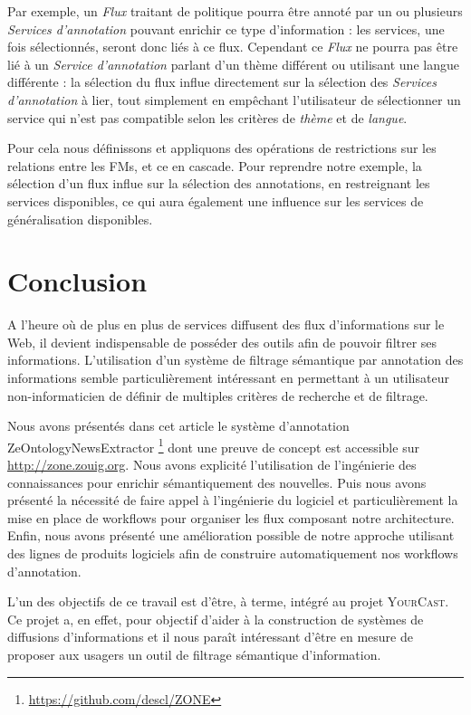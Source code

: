 \documentclass[]{easychair}
\newcommand{\Y}[0]{\textsc{YourCast}\xspace}
\begin{document}
Par exemple, un \textit{Flux} traitant de politique pourra être annoté par un ou plusieurs \textit{Services d'annotation} pouvant enrichir ce type d'information : les services, une fois sélectionnés, seront donc liés à ce flux. Cependant ce \textit{Flux} ne pourra pas être lié à un \textit{Service d'annotation} parlant d'un thème différent ou utilisant une langue différente : la sélection du flux influe directement sur la sélection des \textit{Services d'annotation} à lier, tout simplement en empêchant l'utilisateur de sélectionner un service qui n'est pas compatible selon les critères de \textit{thème} et de \textit{langue}.

Pour cela nous définissons et appliquons des opérations de restrictions sur les relations entre les FMs, et ce en cascade. Pour reprendre notre exemple, la sélection d'un flux influe sur la sélection des annotations, en restreignant les services disponibles, ce qui aura également une influence sur les services de généralisation disponibles. 

\section{Conclusion}
\label{sect:conclusion}
A l'heure où de plus en plus de services diffusent des flux d'informations sur le Web, il devient indispensable de posséder des outils afin de pouvoir filtrer ses informations. L'utilisation d'un système de filtrage sémantique par annotation des informations semble particulièrement intéressant en permettant à un utilisateur non-informaticien de définir de multiples critères de recherche et de filtrage.

Nous avons présentés dans cet article le système d'annotation ZeOntologyNewsExtractor \footnote{\url{https://github.com/descl/ZONE}} dont une preuve de concept est accessible sur \url{http://zone.zouig.org}. Nous avons explicité l'utilisation de l'ingénierie des connaissances pour enrichir sémantiquement des nouvelles. Puis nous avons présenté la nécessité de faire appel à l'ingénierie du logiciel et particulièrement la mise en place de workflows pour organiser les flux composant notre architecture. Enfin, nous avons présenté une amélioration possible de notre approche utilisant des lignes de produits logiciels afin de construire automatiquement nos workflows d'annotation.

L'un des objectifs de ce travail est d'être, à terme, intégré au projet \Y. Ce projet a, en effet, pour objectif d'aider à la construction de systèmes de diffusions d'informations et il nous paraît intéressant d'être en mesure de proposer aux usagers un outil de filtrage sémantique d'information.
\end{document}
